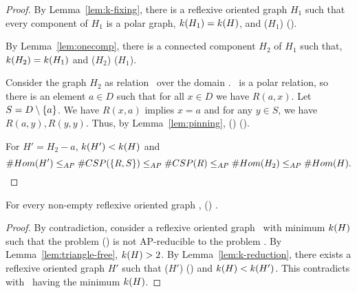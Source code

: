 \begin{proof}
By Lemma~\ref{lem:k-fixing}, there is a reflexive oriented graph \(H_1\) such that
every component of \(H_1\) is a polar graph, \(k(H_1)=k(H)\), and 
\chom(\(H_1\)) \maple \chom(\mH)\@.

By Lemma~\ref{lem:onecomp}, there is a connected component \(H_2\) of \(H_1\) such that,
\(k(H_2)=k(H_1)\) and \chom(\(H_2\)) \maple \chom(\(H_1\))\@.

Consider the graph \(H_2\) as relation \mR\ over the domain \mD\@.
\mR\ is a polar relation, so there is an element \(a \in D\) such that for all \(x \in D\)
we have \(R(a, x)\)\@. Let \(S = D \setminus \{{a}\}\)\@. We have
\(R(x,a)\) implies \(x=a\) and for any \(y \in S\), we have \(R(a, y), R(y, y)\)\@.
Thus, by Lemma~\ref{lem:pinning}, \ccsp() \maple \ccsp(\mR)\@.

For \(H'=H_2 - a\), \(k(H') < k(H)\) and
\[\#Hom(H') \le_{AP} \#CSP(\{{R,S}\}) \le_{AP} \#CSP(R) \le_{AP} \#Hom(H_2) \le_{AP} \#Hom(H).\]
\end{proof}

\begin{theorem}
For every non-empty reflexive oriented graph \mH, \chom(\mH) \mapge \cbis\@.
\end{theorem}


\begin{proof}
By contradiction, consider a reflexive oriented graph \mH\ with minimum \(k(H)\)
such that the problem \chom(\mH) is not AP-reducible to the problem \cbis\@.
By Lemma~\ref{lem:triangle-free}, \(k(H) > 2\)\@. 
By Lemma~\ref{lem:k-reduction}, there exists a reflexive oriented graph \(H'\) such that 
\chom(\(H'\)) \maple \chom(\mH) and \(k(H) < k(H')\)\@.
This contradicts with \mH\ having the minimum \(k(H)\).
\end{proof}
